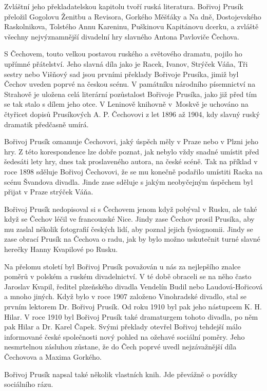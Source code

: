 \documentclass[../dejiny-rodu-prusiku.tex]{subfiles}
\begin{document}
Zvláštní jeho překladatelskou kapitolu tvoří ruská lite­ratura. Bořivoj Prusík přeložil Gogolovu Ženitbu a Revisora, Gorkého Měšťáky a Na dně, Dostojevského Raskolnikova, Tolstého Annu Kareninu, Puškinovu Kapitánovu dcerku, a zvláště všechny nejvýznamnější divadelní hry slavného Antona Pavloviče Čechova.

S Čechovem, touto velkou postavou ruského a světového dramatu, pojilo ho upřímné přátelství. Jeho slavná díla jako je Racek, Ivanov, Strýček Váňa, Tři sestry nebo Višňový sad jsou prvními překlady Bořivoje Prusíka, jimiž byl Čechov uveden poprvé na českou scénu. V památníku národního písemnictví na Strahově je uložena celá literární pozůstalost Bořivoje Prusíka, jako již před tím se tak stalo s dílem jeho otce. V Leninově knihovně v Moskvě je uchováno na čtyřicet dopisů Prusíkových A. P. Čechovovi z let 1896 až 1904, kdy slavný ruský dramatik předčasně umírá.

Bořivoj Prusík oznamuje Čechovovi, jaký úspěch měly v Praze nebo v Plzni jeho hry. Z této korespondence lze dobře poznat, jak nebylo vždy snadné umístit před šedesáti lety hry, dnes tak proslaveného autora, na české scéně. Tak na příklad v roce 1898 sděluje Bořivoj Čechovovi, že se mu konečně podařilo umístiti Racka na scénu Švandova divadla. Jinde zase sděluje s jakým neobyčejným úspěchem byl přijat v Praze strýček Váňa.

Bořivoj Prusík nedopisoval si s Čechovem jenom když po­býval v Rusku, ale také když se Čechov léčil ve francouzské Nice. Jindy zase Čechov prosil Prusíka, aby mu zaslal ně­kolik fotografií českých lidí, aby poznal jejich fysiognomii. Jindy se zase obrací Prusík na Čechova o radu, jak by bylo možno uskutečnit turné slavné herečky Hanny Kvapilové po Rusku.

Na přelomu století byl Bořivoj Prusík považován u nás za nejlepšího znalce poměrů v polském a ruském divadelnictví. V té době obraceli se na něho často Jaroslav Kvapil, ředitel plzeňského divadla Vendelín Budil nebo Laudová-Hořicová a mnoho jiných. Když bylo v roce 1907 založeno Vinohradské divadlo, stal se prvním lektorem Dr. Bořivoj Prusík. Od roku 1910 byl pak jeho nástupcem K. H. Hilar. V roce 1910 byl Bořivoj Prusík také dramaturgem tohoto divadla, po něm pak Hilar a Dr. Karel Čapek. Svými překlady otevřel Bořivoj tehdejší málo informo­vané české společnosti nový pohled na ožehavé sociální poměry. Jeho nesmrtelnou zásluhou zůstane, že do Čech poprvé uvedl nejzávažnější díla Čechovova a Maxima Gor­kého.

Bořivoj Prusík napsal také několik vlastních knih. Jde převážně o povídky sociálního rázu.
\end{document}
